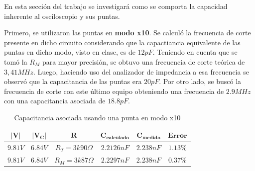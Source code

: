 \documentclass[11pt, a4paper]{article}
\begin{document}
En esta sección del trabajo se investigará como se comporta la capacidad inherente al osciloscopio y sus puntas. 

Primero, se utilizaron las puntas en \textbf{modo x10}. Se calculó la frecuencia de corte presente en dicho circuito considerando que la capactiancia equivalente de las puntas en dicho modo, visto en clase, es de $12pF$. Teniendo en cuenta que se tomó la $R_M$ para mayor precisión, se obtuvo una frecuencia de corte teórica de $3,41MHz$. Luego, haciendo uso del analizador de impedancia a esa frecuencia se observó que la capacitancia de las puntas era $20pF$. Por otro lado, se buscó la frecuencia de corte con este último equipo obteniendo una frecuencia de $2.9MHz$ con una capacitancia asociada de $18.8pF$.
 \begin{center}
     \begin{table}[ht]
     \centering
	 \renewcommand{\arraystretch}{1.1}
         \begin{tabular}{c c c c c c}
            \hline 
            $\bm{|V|}$ &  $\bm{|V_C|}$ & $\bm{R}$ &  $\bm{C_{calculado}}$ &    $\bm{C_{medido}}$   &  $\bm{Error}$\\ \hline
            $9.81V$& $6.84V$ & $R_T = 3k90\Omega$  & $2.2126nF$ & $2.238nF$ & $1.13\%$ \\  
            $9.81V$& $6.84V$ & $R_M = 3k87\Omega$ & $2.2297nF$ & $2.238nF$ & $0.37 \%$ \\   \hline
        \end{tabular}
        \caption{Capacitancia asociada usando una punta en modo x10}
        \label{table:valores_punta_x10}
    \end{table}
\end{center}
\end{document}
